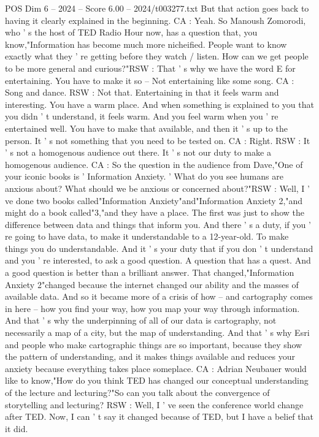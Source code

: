 \begin{textsample}{POS Dim 6 – 2024 – Score 6.00 – 2024/t003277.txt}
But that action goes back to having it clearly explained in the beginning.
CA : Yeah.
So Manoush Zomorodi, who ' s the host of TED Radio Hour now, has a question that, you know,"Information has become much more nicheified.
People want to know exactly what they ' re getting before they watch / listen.
How can we get people to be more general and curious?"RSW : That ' s why we have the word E for entertaining.
You have to make it so -- Not entertaining like some song.
CA : Song and dance.
RSW : Not that.
Entertaining in that it feels warm and interesting.
You have a warm place.
And when something is explained to you that you didn ' t understand, it feels warm.
And you feel warm when you ' re entertained well.
You have to make that available, and then it ' s up to the person.
It ' s not something that you need to be tested on.
CA : Right.
RSW : It ' s not a homogenous audience out there.
It ' s not our duty to make a homogenous audience.
CA : So the question in the audience from Dave,"One of your iconic books is ' Information Anxiety. ' What do you see humans are anxious about?
What should we be anxious or concerned about?"RSW : Well, I ' ve done two books called"Information Anxiety"and"Information Anxiety 2,"and might do a book called"3,"and they have a place.
The first was just to show the difference between data and things that inform you.
And there ' s a duty, if you ' re going to have data, to make it understandable to a 12-year-old.
To make things you do understandable.
And it ' s your duty that if you don ' t understand and you ' re interested, to ask a good question.
A question that has a quest.
And a good question is better than a brilliant answer.
That changed,"Information Anxiety 2"changed because the internet changed our ability and the masses of available data.
And so it became more of a crisis of how -- and cartography comes in here -- how you find your way, how you map your way through information.
And that ' s why the underpinning of all of our data is cartography, not necessarily a map of a city, but the map of understanding.
And that ' s why Esri and people who make cartographic things are so important, because they show the pattern of understanding, and it makes things available and reduces your anxiety because everything takes place someplace.
CA : Adrian Neubauer would like to know,"How do you think TED has changed our conceptual understanding of the lecture and lecturing?"So can you talk about the convergence of storytelling and lecturing?
RSW : Well, I ' ve seen the conference world change after TED.
Now, I can ' t say it changed because of TED, but I have a belief that it did.

\end{textsample}
